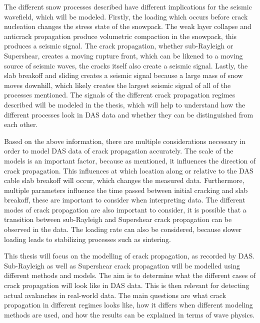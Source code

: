 The different snow processes described have different implications for the seismic wavefield, which will be modeled. Firstly, the loading which occurs before crack nucleation changes the stress state of the snowpack. The weak layer collapse and anticrack propagation produce volumetric compaction in the snowpack, this produces a seismic signal. The crack propagation, whether sub-Rayleigh or Supershear, creates a moving rupture front, which can be likened to a moving source of seismic waves, the cracks itself also create a seismic signal. Lastly, the slab breakoff and sliding creates a seismic signal because a large mass of snow moves downhill, which likely creates the largest seismic signal of all of the processes mentioned. The signals of the different crack propagation regimes described will be modeled in the thesis, which will help to understand how the different processes look in DAS data and whether they can be distinguished from each other. \par

  
  Based on the above information, there are multiple considerations necessary in order to model DAS data of crack propagation accurately. The scale of the models is an important factor, because as mentioned, it influences the direction of crack propagation. This influences at which location along or relative to the DAS cable slab breakoff will occur, which changes the measured data. Furthermore, multiple parameters influence the time passed between initial cracking and slab breakoff, these are important to consider when interpreting data. The different modes of crack propagation are also important to consider, it is possible that a transition between sub-Rayleigh and Supershear crack propagation can be observed in the data. The loading rate can also be considered, because slower loading leads to stabilizing processes such as sintering. \par

  This thesis will focus on the modelling of crack propagation, as recorded by DAS. Sub-Rayleigh as well as Supershear crack propagation will be modelled using different methods and models. The aim is to determine what the different cases of crack propagation will look like in DAS data. This is then relevant for detecting actual avalanches in real-world data. The main questions are what crack propagation in different regimes looks like, how it differs when different modeling methods are used, and how the results can be explained in terms of wave physics. \par

